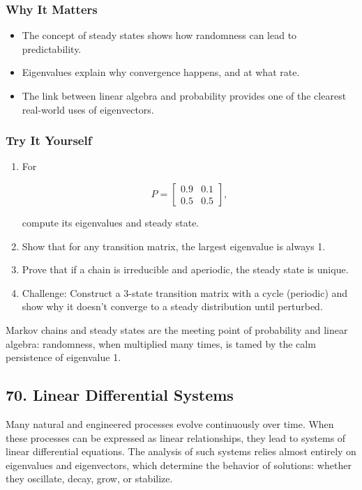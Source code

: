 \documentclass[
  letterpaper,
  DIV=11,
  numbers=noendperiod]{scrreprt}
\providecommand{\tightlist}{%
  \setlength{\itemsep}{0pt}\setlength{\parskip}{0pt}}
\begin{document}
\subsubsection{Why It Matters}\label{why-it-matters-65}

\begin{itemize}
\tightlist
\item
  The concept of steady states shows how randomness can lead to
  predictability.
\item
  Eigenvalues explain why convergence happens, and at what rate.
\item
  The link between linear algebra and probability provides one of the
  clearest real-world uses of eigenvectors.
\end{itemize}

\subsubsection{Try It Yourself}\label{try-it-yourself-68}

\begin{enumerate}
\def\labelenumi{\arabic{enumi}.}
\item
  For

  \[
  P = \begin{bmatrix} 0.9 & 0.1 \\ 0.5 & 0.5 \end{bmatrix},
  \]

  compute its eigenvalues and steady state.
\item
  Show that for any transition matrix, the largest eigenvalue is always
  1.
\item
  Prove that if a chain is irreducible and aperiodic, the steady state
  is unique.
\item
  Challenge: Construct a 3-state transition matrix with a cycle
  (periodic) and show why it doesn't converge to a steady distribution
  until perturbed.
\end{enumerate}

Markov chains and steady states are the meeting point of probability and
linear algebra: randomness, when multiplied many times, is tamed by the
calm persistence of eigenvalue 1.

\subsection{70. Linear Differential
Systems}\label{linear-differential-systems}

Many natural and engineered processes evolve continuously over time.
When these processes can be expressed as linear relationships, they lead
to systems of linear differential equations. The analysis of such
systems relies almost entirely on eigenvalues and eigenvectors, which
determine the behavior of solutions: whether they oscillate, decay,
grow, or stabilize.
\end{document}
